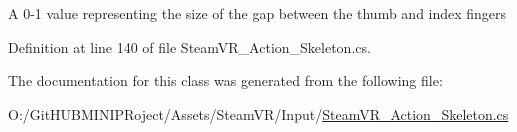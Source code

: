 A 0-\/1 value representing the size of the gap between the thumb and index fingers 



Definition at line 140 of file Steam\+V\+R\+\_\+\+Action\+\_\+\+Skeleton.\+cs.



The documentation for this class was generated from the following file\+:\begin{DoxyCompactItemize}
\item 
O\+:/\+Git\+H\+U\+B\+M\+I\+N\+I\+P\+Roject/\+Assets/\+Steam\+V\+R/\+Input/\mbox{\hyperlink{_steam_v_r___action___skeleton_8cs}{Steam\+V\+R\+\_\+\+Action\+\_\+\+Skeleton.\+cs}}\end{DoxyCompactItemize}
